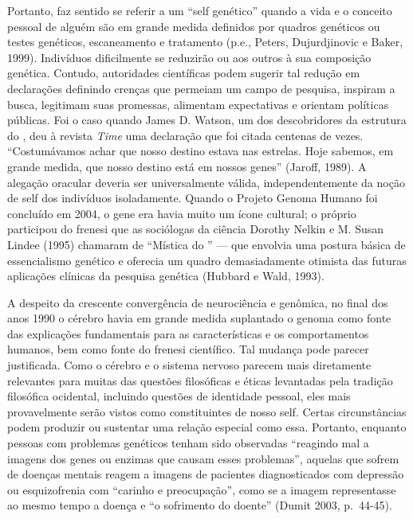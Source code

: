 Portanto, faz sentido se referir a um ``self genético'' quando a vida e
o conceito pessoal de alguém são em grande medida definidos por quadros
genéticos ou testes genéticos, escaneamento e tratamento (p.e., Peters,
Dujurdjinovic e Baker, 1999). Indivíduos dificilmente se reduzirão ou
aos outros à sua composição genética. Contudo, autoridades científicas
podem sugerir tal redução em declarações definindo crenças que permeiam
um campo de pesquisa, inspiram a busca, legitimam suas promessas,
alimentam expectativas e orientam políticas públicas. Foi o caso quando
James D. Watson, um dos descobridores da estrutura do , deu à revista
\emph{Time} uma declaração que foi citada centenas de vezes.
``Costumávamos achar que nosso destino estava nas estrelas. Hoje
sabemos, em grande medida, que nosso destino está em nossos genes''
(Jaroff, 1989). A alegação oracular deveria ser universalmente válida,
independentemente da noção de self dos indivíduos isoladamente. Quando o
Projeto Genoma Humano foi concluído em 2004, o gene era havia muito um
ícone cultural; o próprio  participou do frenesi que as sociólogas da
ciência Dorothy Nelkin e M. Susan Lindee (1995) chamaram de ``Mística do
'' --- que envolvia uma postura básica de essencialismo genético e
oferecia um quadro demasiadamente otimista das futuras aplicações
clínicas da pesquisa genética (Hubbard e Wald, 1993).

A despeito da crescente convergência de neurociência e genômica, no
final dos anos 1990 o cérebro havia em grande medida suplantado o genoma
como fonte das explicações fundamentais para as características e os
comportamentos humanos, bem como fonte do frenesi científico. Tal
mudança pode parecer justificada. Como o cérebro e o sistema nervoso
parecem mais diretamente relevantes para muitas das questões filosóficas
e éticas levantadas pela tradição filosófica ocidental, incluindo
questões de identidade pessoal, eles mais provavelmente serão vistos
como constituintes de nosso self. Certas circunstâncias podem produzir
ou sustentar uma relação especial como essa. Portanto, enquanto pessoas
com problemas genéticos tenham sido observadas ``reagindo mal a imagens
dos genes ou enzimas que causam esses problemas'', aquelas que sofrem de
doenças mentais reagem a imagens de pacientes diagnosticados com
depressão ou esquizofrenia com ``carinho e preocupação'', como se a
imagem representasse ao mesmo tempo a doença e ``o sofrimento do
doente'' (Dumit 2003, p.~44-45).

